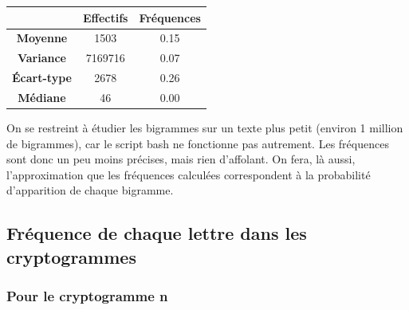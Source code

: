 \documentclass[a4paper, titlepage]{livret}
\begin{document}
\begin{center}
\begin{tabular}{|c|c|c|}
	\hline
	& \textbf{Effectifs} & \textbf{Fréquences}\\
	\hline
	\textbf{Moyenne} &  1503 &  0.15\\
	\hline
	\textbf{Variance} &  7169716 &  0.07\\
	\hline
	\textbf{Écart-type} &  2678 &  0.26\\
	\hline
	\textbf{Médiane} &   46 &  0.00\\
	\hline
\end{tabular}
\label{tab12}
\end{center}

On se restreint à étudier les bigrammes sur un texte plus petit (environ 1 million de bigrammes), car le script bash ne fonctionne pas autrement.
Les fréquences sont donc un peu moins précises, mais rien d'affolant.
On fera, là aussi, l'approximation que les fréquences calculées correspondent à la probabilité d'apparition de chaque bigramme.


\subsection{Fréquence de chaque lettre dans les cryptogrammes}

\subsubsection{Pour le cryptogramme n}
\end{document}
